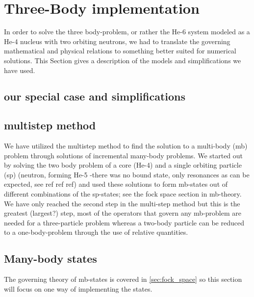 \section{Three-Body implementation}
In order to solve the three body-problem, or rather the He-6 system modeled as a He-4 nucleus with two orbiting neutrons, we had to translate the governing mathematical and physical relations to something better suited for numerical solutions.
 This Section gives a description of the models and simplifications we have used.

\subsection{our special case and simplifications}
\subsection{multistep method}
We have utilized the multistep method to find the solution to a multi-body (mb) problem through solutions of incremental many-body problems.
 We started out by solving the two body problem of a core (He-4) and a single orbiting particle (sp) (neutron, forming He-5 -there was no bound state, only resonances as can be expected, see ref ref ref) and used these solutions to form mb-states out of different combinations of the sp-states; see the fock space section in mb-theory.
 We have only reached the second step in the multi-step method but this is the greatest (largest?) step, most of the operators that govern any mb-problem are needed for a three-particle problem whereas a two-body particle can be reduced to a one-body-problem through the use of relative quantities.
 
\subsection{Many-body states}
The governing theory of mb-states is covered in \ref{sec:fock_space} so this section will focus on one way of implementing the states. 

